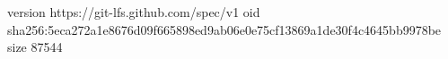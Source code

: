 version https://git-lfs.github.com/spec/v1
oid sha256:5eca272a1e8676d09f665898ed9ab06e0e75cf13869a1de30f4c4645bb9978be
size 87544

